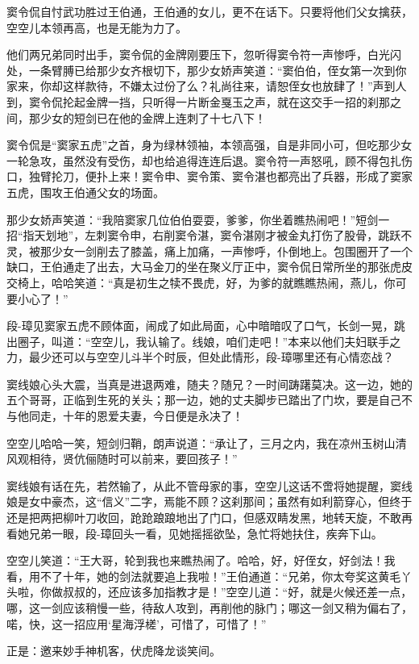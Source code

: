 \documentclass[12pt,oneside]{book}
\begin{document}
窦令侃自忖武功胜过王伯通，王伯通的女儿，更不在话下。只要将他们父女擒获，空空儿本领再高，也是无能为力了。

他们两兄弟同时出手，窦令侃的金牌刚要压下，忽听得窦令符一声惨呼，白光闪处，一条臂膊已给那少女齐根切下，那少女娇声笑道：``窦伯伯，侄女第一次到你家来，你却这样款待，不嫌太过份了么？礼尚往来，请恕侄女也放肆了！''声到人到，窦令侃抡起金牌一挡，只听得一片断金戛玉之声，就在这交手一招的刹那之间，那少女的短剑已在他的金牌上连刺了十七八下！

窦令侃是``窦家五虎''之首，身为绿林领袖，本领高强，自是非同小可，但吃那少女一轮急攻，虽然没有受伤，却也给追得连连后退。窦令符一声怒吼，顾不得包扎伤口，独臂抡刀，便扑上来！窦令申、窦令策、窦令湛也都亮出了兵器，形成了窦家五虎，围攻王伯通父女的场面。

那少女娇声笑道：``我陪窦家几位伯伯耍耍，爹爹，你坐着瞧热闹吧！''短剑一招``指天划地''，左刺窦令申，右削窦令湛，窦令湛刚才被金丸打伤了股骨，跳跃不灵，被那少女一剑削去了膝盖，痛上加痛，一声惨呼，仆倒地上。包围圈开了一个缺口，王伯通走了出去，大马金刀的坐在聚义厅正中，窦令侃日常所坐的那张虎皮交椅上，哈哈笑道：``真是初生之犊不畏虎，好，为爹的就瞧瞧热闹，燕儿，你可要小心了！''

段-璋见窦家五虎不顾体面，闹成了如此局面，心中暗暗叹了口气，长剑一晃，跳出圈子，叫道：``空空儿，我认输了。线娘，咱们走吧！''本来以他们夫妇联手之力，最少还可以与空空儿斗半个时辰，但处此情形，段-璋哪里还有心情恋战？

窦线娘心头大震，当真是进退两难，随夫？随兄？一时间踌躇莫决。这一边，她的五个哥哥，正临到生死的关头；那一边，她的丈夫脚步已踏出了门坎，要是自己不与他同走，十年的恩爱夫妻，今日便是永决了！

空空儿哈哈一笑，短剑归鞘，朗声说道：``承让了，三月之内，我在凉州玉树山清风观相待，贤伉俪随时可以前来，要回孩子！''

窦线娘有话在先，若然输了，从此不管母家的事，空空儿这话不啻将她提醒，窦线娘是女中豪杰，这``信义''二字，焉能不顾？这刹那间；虽然有如利箭穿心，但终于还是把两把柳叶刀收回，跄跄踉踉地出了门口，但感双睛发黑，地转天旋，不敢再看她兄弟一眼，段-璋回头一看，见她摇摇欲坠，急忙将她扶住，疾奔下山。

空空儿笑道：``王大哥，轮到我也来瞧热闹了。哈哈，好，好侄女，好剑法！我看，用不了十年，她的剑法就要追上我啦！''王伯通道：``兄弟，你太夸奖这黄毛丫头啦，你做叔叔的，还应该多加指教才是！''空空儿道：``好，就是火候还差一点，哪，这一剑应该稍慢一些，待敌人攻到，再削他的脉门；哪这一剑又稍为偏右了，喏，快，这一招应用`星海浮槎'，可惜了，可惜了！''

正是：邀来妙手神机客，伏虎降龙谈笑间。
\end{document}
